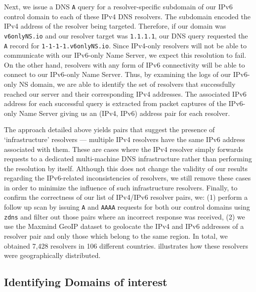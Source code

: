 Next, we issue a DNS {\tt A} query for a resolver-specific subdomain of our
IPv6 control domain to each of these IPv4 DNS resolvers. The subdomain encoded
the IPv4 address of the resolver being targeted. Therefore, if our domain was
{\tt v6onlyNS.io} and our resolver target was {\tt 1.1.1.1}, our DNS query
requested the {\tt A} record for {\tt 1-1-1-1.v6onlyNS.io}. 
%
Since IPv4-only resolvers will not be able to communicate with our IPv6-only
Name Server, we expect this resolution to fail. On the other hand, resolvers
with any form of IPv6 connectivity will be able to connect to our IPv6-only
Name Server.
%
Thus, by examining the logs of our IPv6-only NS domain, we are able
to identify the set of resolvers that successfully reached our server and
their corresponding IPv4 addresses. The associated IPv6 address for each
successful query is extracted from packet captures of the IPv6-only Name
Server giving us an (IPv4, IPv6) address pair for each resolver.

The approach detailed above yields pairs that suggest the presence of
`infrastructure' resolvers --- \eg multiple IPv4 resolvers have the same IPv6
address associated with them. These are cases where the IPv4 resolver simply
forwards requests to a dedicated multi-machine DNS infrastructure rather than
performing the resolution by itself. Although this does not change the validity
of our results regarding the IPv6-related inconsistencies of resolvers, we
still remove these cases in order to minimize the influence of such
infrastructure resolvers.
%
Finally, to confirm the correctness of our list of IPv4/IPv6 resolver pairs,
we: (1) perform a follow up scan by issuing {\tt A} and {\tt AAAA} requests for
both our control domains using {\tt zdns} \cite{Durumeric13zmap} and filter out
those pairs where an incorrect response was received, (2) we use the Maxmind
GeoIP dataset \cite{maxmind-connectiondb} to geolocate the IPv4 and IPv6
addresses of a resolver pair and only those which belong to the same region.
% 
In total, we obtained 7,428 resolvers in 106 different countries.
 illustrates how these resolvers were
geographically distributed.


\subsection{Identifying Domains of interest}\label{ssec:censored-domains}

